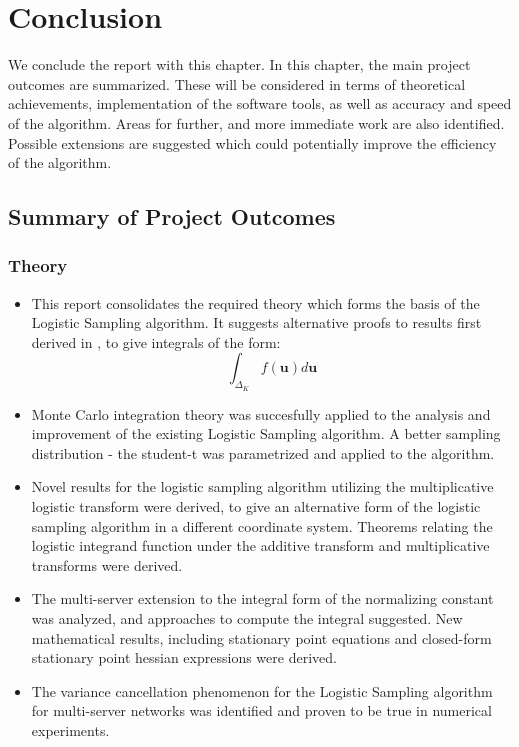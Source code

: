\chapter{Conclusion}

We conclude the report with this chapter. In this chapter, the main project outcomes are summarized. These will be considered in terms of theoretical achievements, implementation of the software tools, as well as accuracy and speed of the algorithm. Areas for further, and more immediate work are also identified. Possible extensions are suggested which could potentially improve the efficiency of the algorithm.

\section{Summary of Project Outcomes}
\subsection{Theory}
\begin{itemize}[leftmargin=*]
    \item This report consolidates the required theory which forms the basis of the Logistic Sampling algorithm. It suggests alternative proofs to results first derived in \cite{Casale2017AcceleratingMethods}, to give integrals of the form:
    \[\int_{\Delta_K} f(\mathbf{u}) d \mathbf{u}\]
    \item Monte Carlo integration theory was succesfully applied to the analysis and improvement of the existing Logistic Sampling algorithm. A better sampling distribution - the student-t was parametrized and applied to the algorithm.
    \item Novel results for the logistic sampling algorithm utilizing the multiplicative logistic transform were derived, to give an alternative form of the logistic sampling algorithm in a different coordinate system. Theorems relating the logistic integrand function under the additive transform and multiplicative transforms were derived.
    \item The multi-server extension to the integral form of the normalizing constant was analyzed, and approaches to compute the integral suggested. New mathematical results, including stationary point equations and closed-form stationary point hessian expressions were derived.
    \item The variance cancellation phenomenon for the Logistic Sampling algorithm for multi-server networks was identified and proven to be true in numerical experiments.
\end{itemize}

